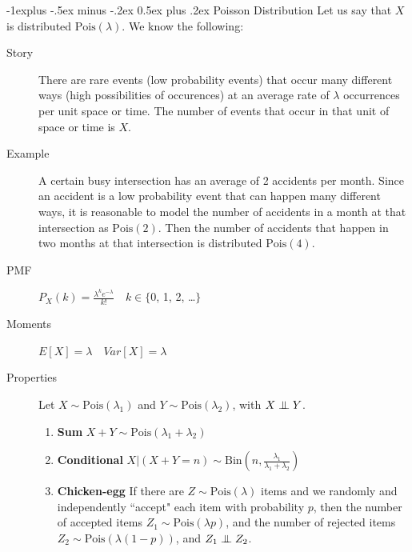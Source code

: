\documentclass[10pt,landscape]{article}
\makeatletter
\newcommand\independent{\protect\mathpalette{\protect\independenT}{\perp}}
\def\independenT#1#2{\mathrel{\setbox0\hbox{$#1#2$}%
    \copy0\kern-\wd0\mkern4mu\box0}}
\newcommand{\Bin}{\textrm{Bin}}
\newcommand{\Pois}{\textrm{Pois}}
\renewcommand{\subsection}{\@startsection{subsection}{2}{0mm}%
                                {-1explus -.5ex minus -.2ex}%
                                {0.5ex plus .2ex}%
                                {\normalfont\normalsize\bfseries}}
\makeatother
\begin{document}
\begin{multicols*}{3}
	\subsection{Poisson Distribution} Let us say that $X$ is distributed $\Pois(\lambda)$. We know the following:
	\begin{description}
		\item[Story] There are rare events (low probability events) that occur many different ways (high possibilities of occurences) at an average rate of $\lambda$ occurrences per unit space or time. The number of events that occur in that unit of space or time is $X$.
												    
		\item[Example] A certain busy intersection has an average of 2 accidents per month. Since an accident is a low probability event that can happen many different ways, it is reasonable to model the number of accidents in a month at that intersection as $\Pois(2)$. Then the number of accidents that happen in two months at that intersection is distributed $\Pois(4)$.
		\item[PMF] $P_X(k) = \frac{\lambda^ke^{-\lambda}}{k!} \quad k \in \{$0, 1, 2, \dots $\}$ 
		\item[Moments] $E[X] = \lambda \quad Var[X] = \lambda$
												    
		\item[Properties]
		Let $X \sim \Pois(\lambda_1)$ and $Y \sim \Pois(\lambda_2)$, with $X \independent Y$.
												
		\begin{enumerate}
			\item \textbf{Sum} $X + Y \sim \Pois(\lambda_1 + \lambda_2)$
			\item \textbf{Conditional} $X | (X + Y = n) \sim \Bin\left(n, \frac{\lambda_1}{\lambda_1 + \lambda_2}\right)$
			\item \textbf{Chicken-egg} If there are $Z \sim \Pois(\lambda)$ items and we randomly and independently ``accept" each item with probability $p$, then the number of accepted items $Z_1 \sim \Pois(\lambda p)$, and the number of rejected items $Z_2 \sim \Pois(\lambda (1-p))$, and $Z_1 \independent Z_2$.
		\end{enumerate}
												    
	\end{description}
									

\end{multicols*}
\end{document}
